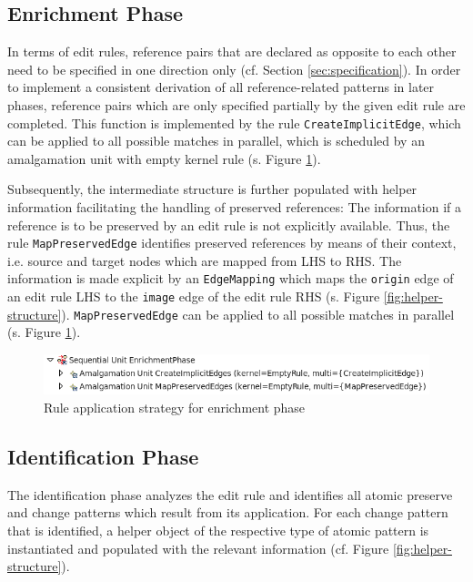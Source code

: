 \documentclass{llncs}
\begin{document}
\subsection{Enrichment Phase}
In terms of edit rules, reference pairs that are declared as opposite to each
other need to be specified in one direction only (cf. Section \ref{sec:specification}).
In order to implement a consistent derivation of all 
reference-related patterns in later phases, reference pairs which are only
specified partially by the given edit rule are completed. This function is implemented
by the rule \texttt{CreateImplicitEdge}, which can
be applied to all possible matches in parallel, which is 
scheduled by an amalgamation unit with empty 
kernel rule (s. Figure \ref{fig:enrichmentUnit}).

Subsequently, the intermediate structure 
is further populated with helper information facilitating the handling
of preserved references: The information if a reference is to be
preserved by an edit rule is not explicitly available.
Thus, the rule \texttt{MapPreservedEdge} identifies preserved
references by means of their context, i.e. source and
target nodes which are mapped from LHS to RHS. 
The information is made explicit by an \texttt{EdgeMapping} which maps
the \texttt{origin} edge of an edit rule LHS to the \texttt{image} edge of the edit rule RHS
(s. Figure \ref{fig:helper-structure}).
\texttt{MapPreservedEdge} can be applied to all possible matches
in parallel (s. Figure \ref{fig:enrichmentUnit}).

\begin{figure}[htbp]
  \centering
  \includegraphics[scale=0.7]{pic/enrichmentUnit.png}
  \caption{Rule application strategy for enrichment phase}
  \label{fig:enrichmentUnit}
\end{figure}

\subsection{Identification Phase}
The identification phase analyzes the edit rule and identifies all
atomic preserve and change patterns which result from its application.
For each change pattern that is identified, a helper object of 
the respective type of atomic pattern is instantiated and
populated with the relevant information 
(cf. Figure \ref{fig:helper-structure}).
\end{document}
